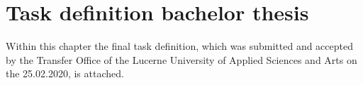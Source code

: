 \clearpage
{}

\chapter{Task definition bachelor thesis}
\label{app:Task-Definition}
Within this chapter the final task definition, which was submitted and accepted by the Transfer Office of the Lucerne University of Applied Sciences and Arts on the 25.02.2020, is attached.


